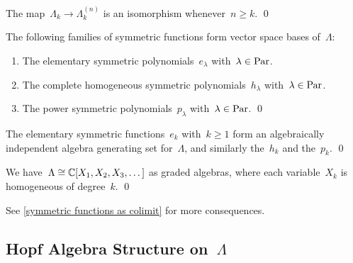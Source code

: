 \documentclass[a4paper, 11pt, twoside=semi]{scrartcl}
\begin{document}
\begin{corollary}
  \label{iso in each degree for sufficiently large}
  The map~$\Lambda_k \to \Lambda^{(n)}_k$ is an isomorphism whenever~$n \geq k$.
  \qed
\end{corollary}

\begin{corollary}
  \label{bases for symmetric functions}
  The following families of symmetric functions form vector space bases of~$\Lambda$:
  \begin{enumerate}
    \item
      The elementary symmetric polynomials~$e_\lambda$ with~$\lambda \in \mathrm{Par}$.
    \item
      The complete homogeneous symmetric polynomials~$h_\lambda$ with~$\lambda \in \mathrm{Par}$.
    \item
      The power symmetric polynomials~$p_\lambda$ with~$\lambda \in \mathrm{Par}$.
    \qed
  \end{enumerate}
\end{corollary}

\begin{corollary}
  The elementary symmetric functions~$e_k$ with~$k \geq 1$ form an algebraically independent algebra generating set for~$\Lambda$, and similarly the~$h_k$ and the~$p_k$.
  \qed
\end{corollary}

\begin{corollary}
  We have~$\Lambda \cong \mathbb{C}[X_1, X_2, X_3, \dotsc]$ as graded algebras, where each variable~$X_k$ is homogeneous of degree~$k$.
  \qed
\end{corollary}

See \cref{symmetric functions as colimit} for more consequences.



\subsection{Hopf Algebra Structure on~$\Lambda$}
\end{document}
